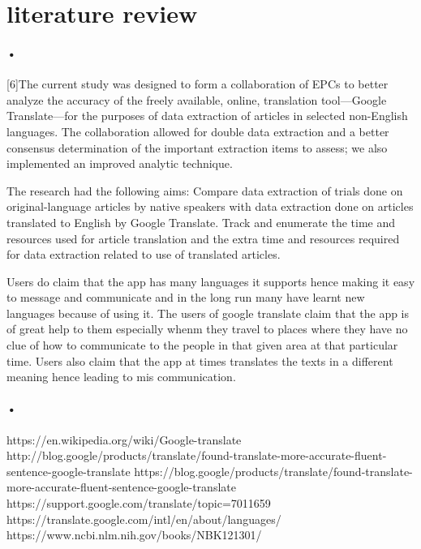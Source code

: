\documentclass[12pt]{article}
\begin{document}
\section{literature review}
\paragraph{•}
[6]The current study was designed to form a collaboration of EPCs to better analyze the accuracy of the freely available, online, translation tool—Google Translate—for the purposes of data extraction of articles in selected non-English languages. The collaboration allowed for double data extraction and a better consensus determination of the important extraction items to assess; we also implemented an improved analytic technique.

The research had the following aims:
Compare data extraction of trials done on original-language articles by native speakers with data extraction done on articles translated to English by Google Translate.
Track and enumerate the time and resources used for article translation and the extra time and resources required for data extraction related to use of translated articles.

Users do claim that the app has many languages it supports hence making it easy to message and communicate and in the long run many have learnt new languages because of using it.
The users of google translate claim that the app is of great help to them especially whenm they travel to places where they have no clue of how to communicate to the people in that given area at that particular time.
Users also claim that the app at times translates the texts in a different meaning hence leading to mis communication.

\paragraph{•}




\begin{thebibliography}{9}
\bibitem{}
https://en.wikipedia.org/wiki/Google-translate
\bibitem{}
http://blog.google/products/translate/found-translate-more-accurate-fluent-sentence-google-translate
 \bibitem{}
https://blog.google/products/translate/found-translate-more-accurate-fluent-sentence-google-translate
 \bibitem{}
https://support.google.com/translate/topic=7011659
\bibitem{}
https://translate.google.com/intl/en/about/languages/
\bibitem{}
https://www.ncbi.nlm.nih.gov/books/NBK121301/



\end{thebibliography}
\end{document}
